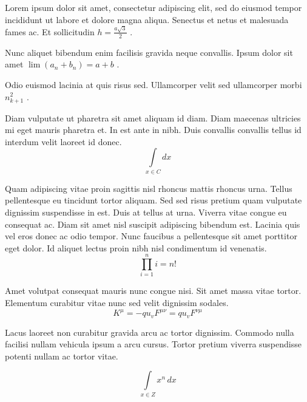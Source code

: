 \documentclass{article}
\begin{document}
Lorem ipsum dolor sit amet, consectetur adipiscing elit, sed do eiusmod tempor incididunt ut labore et dolore magna aliqua. Senectus et netus et malesuada fames ac. Et sollicitudin 
\begin{math}
	h=\frac{a\sqrt{3}}{2}
\end{math}
.\newline
 
Nunc aliquet bibendum enim facilisis gravida neque convallis. Ipsum dolor sit amet 
$ \lim\left ( a_n+b_n \right )=a+b $
.\newline
    
Odio euismod lacinia at quis risus sed. Ullamcorper velit sed ullamcorper morbi 
\( n_{k+1}^2 \)
.\newline

Diam vulputate ut pharetra sit amet aliquam id diam. Diam maecenas ultricies mi eget mauris pharetra et. In est ante in nibh. Duis convallis convallis tellus id interdum velit laoreet id donec. 
\[ \int\limits_{x\in C}dx \]

Quam adipiscing vitae proin sagittis nisl rhoncus mattis rhoncus urna. Tellus pellentesque eu tincidunt tortor aliquam. Sed sed risus pretium quam vulputate dignissim suspendisse in est. Duis at tellus at urna. Viverra vitae congue eu consequat ac. Diam sit amet nisl suscipit adipiscing bibendum est. Lacinia quis vel eros donec ac odio tempor. Nunc faucibus a pellentesque sit amet porttitor eget dolor. Id aliquet lectus proin nibh nisl condimentum id venenatis.
$$ \prod_{i=1}^ni=n! $$

Amet volutpat consequat mauris nunc congue nisi. Sit amet massa vitae tortor. Elementum curabitur vitae nunc sed velit dignissim sodales. 
\begin{displaymath}
	K^\mu =-qu_vF^{\mu \nu }=qu_vF^{\nu \mu }
\end{displaymath}

Lacus laoreet non curabitur gravida arcu ac tortor dignissim. Commodo nulla facilisi nullam vehicula ipsum a arcu cursus. Tortor pretium viverra suspendisse potenti nullam ac tortor vitae. 

\begin{equation}
	\int\limits_{x\in Z}\! x^{n}\, dx
\end{equation}
\end{document}

